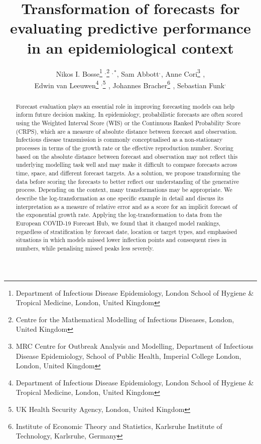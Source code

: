 \documentclass{article}
\begin{document}
\title{Transformation of forecasts for evaluating predictive performance in an epidemiological context}
  \author{Nikos I. Bosse\thanks{Department of Infectious Disease Epidemiology, London School of Hygiene \& Tropical Medicine, London, United Kingdom} $^{,}$\thanks{Centre for the Mathematical Modelling of Infectious Diseases, London, United Kingdom} $^{,*}$, 
  Sam Abbott\footnotemark[1] $^{,}$\footnotemark[2]$ ^{}$, 
  Anne Cori\thanks{MRC Centre for Outbreak Analysis and Modelling, Department of Infectious Disease Epidemiology, School of Public Health, Imperial College London, London, United Kingdom} $^{}$, \\
  Edwin van Leeuwen\thanks{Department of Infectious Disease Epidemiology, London School of Hygiene \& Tropical Medicine, London, United Kingdom} $^{,}$\thanks{UK Health Security Agency, London, United Kingdom} $^{}$, 
  Johannes Bracher\thanks{Institute of Economic Theory and Statistics, Karlsruhe Institute of Technology, Karlsruhe, Germany} $^{}$, 
  Sebastian Funk\footnotemark[1] $^{,}$\footnotemark[2]$ ^{}$}



\maketitle
\begin{abstract}
Forecast evaluation plays an essential role in improving forecasting models can help inform future decision making. In epidemiology, probabilistic forecasts are often scored using the Weighted Interval Score (WIS) or the Continuous Ranked Probability Score (CRPS), which are a measure of absolute distance between forecast and observation. Infectious disease transmission is commonly conceptualised as a non-stationary processes in terms of the growth rate or the effective reproduction number. Scoring based on the absolute distance between forecast and observation may not reflect this underlying modelling task well and may make it difficult to compare forecasts across time, space, and different forecast targets. As a solution, we propose transforming the data before scoring the forecasts to better reflect our understanding of the generative process. Depending on the context, many transformations may be appropriate. We describe the log-transformation as one specific example in detail and discuss its interpretation as a measure of relative error and as a score for an implicit forecast of the exponential growth rate. Applying the log-transformation to data from the European COVID-19 Forecast Hub, we found that it changed model rankings, regardless of stratification by forecast date, location or target types, and emphasised situations in which models missed lower inflection points and consequent rises in numbers, while penalising missed peaks less severely. 
\end{abstract}
\end{document}
